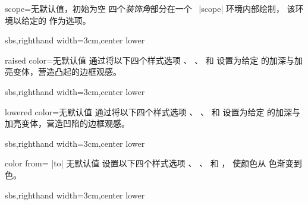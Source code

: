 \begin{vigTcbKey}[][doc new=2016-05-24]{scope}{=}{无默认值，初始为空}
  四个\emph{装饰角}部分在一个 \tikzname\ |scope| 环境内部绘制，
  该环境以给定的  作为选项。
\begin{dispExample*}{sbs,righthand width=3cm,center lower}
\end{dispExample*}
\end{vigTcbKey}



\begin{vigTcbKey}[][doc new=2016-04-22]{raised color}{=}{无默认值}
  通过将以下四个样式选项
  、
  、
   和
  设置为给定  的加深与加亮变体，营造凸起的边框观感。
\begin{dispExample*}{sbs,righthand width=3cm,center lower}
\end{dispExample*}
\end{vigTcbKey}


\begin{vigTcbKey}[][doc new=2016-04-22]{lowered color}{=}{无默认值}
  通过将以下四个样式选项
  、
  、
   和
  设置为给定  的加深与加亮变体，营造凹陷的边框观感。
\begin{dispExample*}{sbs,righthand width=3cm,center lower}
\end{dispExample*}
\end{vigTcbKey}


\begin{vigTcbKey}[][doc new=2016-04-22]{color from}{= |to| }{无默认值}
  设置以下四个样式选项
  、
  、
   和
  ，
  使颜色从  色渐变到  色。
\begin{dispExample*}{sbs,righthand width=3cm,center lower}
\end{dispExample*}
\end{vigTcbKey}



